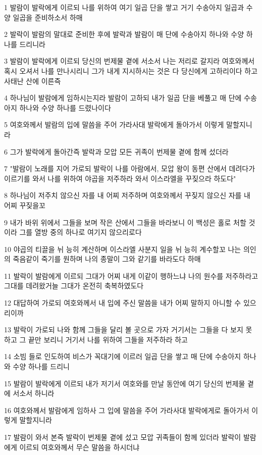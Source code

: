 \par 1 발람이 발락에게 이르되 나를 위하여 여기 일곱 단을 쌓고 거기 수송아지 일곱과 수양 일곱을 준비하소서 하매
\par 2 발락이 발람의 말대로 준비한 후에 발락과 발람이 매 단에 수송아지 하나와 수양 하나를 드리니라
\par 3 발람이 발락에게 이르되 당신의 번제물 곁에 서소서 나는 저리로 갈지라 여호와께서 혹시 오셔서 나를 만나시리니 그가 내게 지시하시는 것은 다 당신에게 고하리이다 하고 사태난 산에 이른즉
\par 4 하나님이 발람에게 임하시는지라 발람이 고하되 내가 일곱 단을 베풀고 매 단에 수송아지 하나와 수양 하나를 드렸나이다
\par 5 여호와께서 발람의 입에 말씀을 주어 가라사대 발락에게 돌아가서 이렇게 말할지니라
\par 6 그가 발락에게 돌아간즉 발락과 모압 모든 귀족이 번제물 곁에 함께 섰더라
\par 7 "발람이 노래를 지어 가로되 발락이 나를 아람에서, 모압 왕이 동편 산에서 데려다가 이르기를 와서 나를 위하여 야곱을 저주하라 와서 이스라엘을 꾸짖으라 하도다"
\par 8 하나님이 저주치 않으신 자를 내 어찌 저주하며 여호와께서 꾸짖지 않으신 자를 내 어찌 꾸짖을꼬
\par 9 내가 바위 위에서 그들을 보며 작은 산에서 그들을 바라보니 이 백성은 홀로 처할 것이라 그를 열방 중의 하나로 여기지 않으리로다
\par 10 야곱의 티끌을 뉘 능히 계산하며 이스라엘 사분지 일을 뉘 능히 계수할꼬 나는 의인의 죽음같이 죽기를 원하며 나의 종말이 그와 같기를 바라도다 하매
\par 11 발락이 발람에게 이르되 그대가 어찌 내게 이같이 행하느냐 나의 원수를 저주하라고 그대를 데려왔거늘 그대가 온전히 축복하였도다
\par 12 대답하여 가로되 여호와께서 내 입에 주신 말씀을 내가 어찌 말하지 아니할 수 있으리이까
\par 13 발락이 가로되 나와 함께 그들을 달리 볼 곳으로 가자 거기서는 그들을 다 보지 못하고 그 끝만 보리니 거기서 나를 위하여 그들을 저주하라 하고
\par 14 소빔 들로 인도하여 비스가 꼭대기에 이르러 일곱 단을 쌓고 매 단에 수송아지 하나와 수양 하나를 드리니
\par 15 발람이 발락에게 이르되 내가 저기서 여호와를 만날 동안에 여기 당신의 번제물 곁에 서소서 하니라
\par 16 여호와께서 발람에게 임하사 그 입에 말씀을 주어 가라사대 발락에게로 돌아가서 이렇게 말할지니라
\par 17 발람이 와서 본즉 발락이 번제물 곁에 섰고 모압 귀족들이 함께 있더라 발락이 발람에게 이르되 여호와께서 무슨 말씀을 하시더냐
